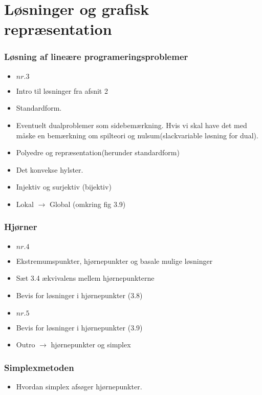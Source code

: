 \documentclass{beamer}
\begin{document}
\section{Løsninger og grafisk repræsentation}
%
\begin{frame}
\frametitle{Løsning af lineære programeringsproblemer}
\begin{itemize}
\item \textbf{$nr. 3$}
\item Intro til løsninger fra afsnit 2
\item Standardform.
\item Eventuelt dualproblemer som sidebemærkning. Hvis vi skal have det med måske en bemærkning om spilteori og nulsum(slackvariable løsning for dual).
\item Polyedre og repræsentation(herunder standardform)
\item Det konvekse hylster.
\item Injektiv og surjektiv (bijektiv)
\item Lokal $\rightarrow$ Global (omkring fig 3.9)
\end{itemize}
\end{frame}
%
\begin{frame}
\frametitle{Hjørner}
\begin{itemize}
\item \textbf{$nr. 4$}
\item Ekstremumspunkter, hjørnepunkter og basale mulige løsninger
\item Sæt 3.4 ækvivalens mellem hjørnepunkterne
\item Bevis for løsninger i hjørnepunkter (3.8)
\item \textbf{$nr. 5$}
\item Bevis for løsninger i hjørnepunkter (3.9)
\item Outro $\rightarrow$ hjørnepunkter og simplex
\end{itemize}
\end{frame}
%
\begin{frame}
\frametitle{Simplexmetoden}
\begin{itemize}
\item Hvordan simplex afsøger hjørnepunkter.
\end{itemize}
\end{frame}
\end{document}

